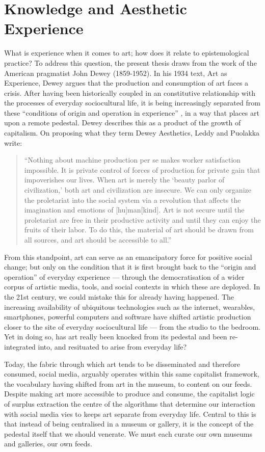 \section{Knowledge and Aesthetic Experience}
\label{ssec: aesthetic experience}
What is experience when it comes to art; how does it relate to epistemological practice? To address this question, the present thesis draws from the work of the American pragmatist John Dewey (1859-1952). In his 1934 text, Art as Experience, Dewey argues that the production and consumption of art faces a crisis. After having been historically coupled in an constitutive relationship with the processes of everyday sociocultural life, it is being increasingly separated from these “conditions of origin and operation in experience” \citep{dewey1934}, in a way that places art upon a remote pedestal. Dewey describes this as a product of the growth of capitalism. On proposing what they term Dewey Aesthetics, Leddy and Puolakka write:
\begin{quote}
    “Nothing about machine production per se makes worker satisfaction impossible. It is private control of forces of production for private gain that impoverishes our lives. When art is merely the ‘beauty parlor of civilization,’ both art and civilization are insecure. We can only organize the proletariat into the social system via a revolution that affects the imagination and emotions of [hu]man[kind]. Art is not secure until the proletariat are free in their productive activity and until they can enjoy the fruits of their labor. To do this, the material of art should be drawn from all sources, and art should be accessible to all.” \citep{leddy2021}
\end{quote}
From this standpoint, art can serve as an emancipatory force for positive social change; but only on the condition that it is first brought back to the “origin and operation” of everyday experience — through the democratisation of a wider corpus of artistic media, tools, and social contexts in which these are deployed. In the 21st century, we could mistake this for already having happened. The increasing availability of ubiquitous technologies such as the internet, wearables, smartphones, powerful computers and software have shifted artistic production closer to the site of everyday sociocultural life — from the studio to the bedroom. Yet in doing so, has art really been knocked from its pedestal and been re-integrated into, and resituated to arise from everyday life? 

Today, the fabric through which art tends to be disseminated and therefore consumed, social media, arguably operates within this same capitalist framework, the vocabulary having shifted from art in the museum, to content on our feeds. Despite making art more accessible to produce and consume, the capitalist logic of surplus extraction the centre of the algorithms that determine our interaction with social media vies to keeps art separate from everyday life. Central to this is that instead of being centralised in a museum or gallery, it is the concept of the pedestal itself that we should venerate. We must each curate our own museums and galleries, our own feeds.

